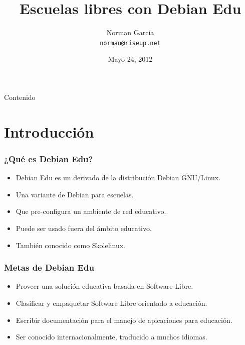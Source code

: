 \documentclass{beamer}
\title{Escuelas libres con Debian Edu}
\author[n0rman]{Norman Garc\'ia \\ \texttt{norman@riseup.net}}
\institute{Debian Nicaragua}
\date{Mayo 24, 2012}
\begin{document}
\begin{frame}
	\titlepage
\end{frame}

\begin{frame}{Contenido}
	\tableofcontents
\end{frame}


\section{Introducci\'on}

\begin{frame}
\frametitle{¿Qu\'e es Debian Edu?}
        
	\begin{itemize}
                \pause \item Debian Edu es un derivado de la distribuci\'on Debian GNU/Linux.
		\pause \item Una variante de Debian para escuelas.
		\pause \item Que pre-configura un ambiente de red educativo.
		\pause \item Puede ser usado fuera del \'ambito educativo.
		\pause \item Tambi\'en conocido como Skolelinux.
       \end{itemize}

\end{frame}

\begin{frame}
\frametitle{Metas de Debian Edu}    
        \begin{itemize}
                \pause \item Proveer una soluci\'on educativa basada 
			en Software Libre.
		\pause \item Clasificar y empaquetar Software Libre
			orientado a educaci\'on.
		\pause \item Escribir documentaci\'on para el manejo 
			de apicaciones para educaci\'on.
		\pause \item Ser conocido internacionalmente, traducido
			a muchos idiomas.
        \end{itemize}
\end{frame}
\end{document}
